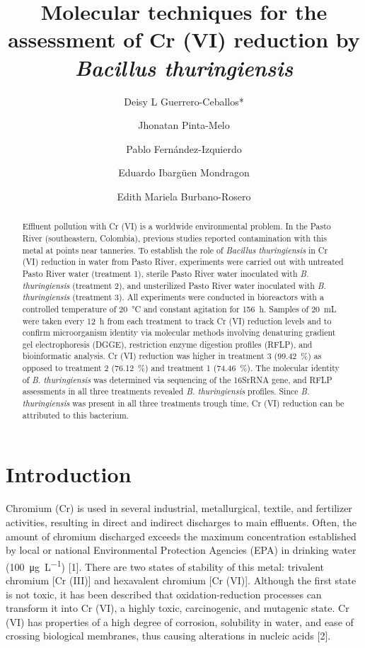 \documentclass{univsciauth}
\title{
        Molecular techniques for the assessment of Cr (VI) reduction by
        \emph{Bacillus thuringiensis}
}
\author[1]{Deisy L Guerrero-Ceballos*}
\author[1]{Jhonatan Pinta-Melo}
\author[1]{Pablo Fernández-Izquierdo}
\author[2]{Eduardo Ibargüen Mondragon}
\author[1,2]{Edith Mariela Burbano-Rosero}
\begin{document}
\maketitle
\thispagestyle{firstpage}

\begin{abstract}
Effluent pollution with Cr (VI) is a worldwide
environmental problem. In the Pasto River (southeastern, Colombia),
previous studies reported contamination with this metal at points near
tanneries. To establish the role of \emph{Bacillus thuringiensis} in Cr
(VI) reduction in water from Pasto River, experiments were carried out
with untreated Pasto River water (treatment 1), sterile Pasto
River water inoculated with \emph{B. thuringiensis} (treatment 2), and
unsterilized Pasto River water inoculated with \emph{B. thuringiensis}
(treatment 3). All experiments were conducted in bioreactors with a
controlled temperature of \SI{20}{\celsius} and constant agitation for \SI{156}{h}.
Samples of \SI{20}{mL} were taken every \SI{12}{h} from each treatment to track
Cr (VI) reduction levels and to confirm microorganism identity via
molecular methods involving denaturing gradient gel electrophoresis
(DGGE), restriction enzyme digestion profiles (RFLP), and bioinformatic
analysis. Cr (VI) reduction was higher in treatment 3 (\SI{99.42}{\%}) as
opposed to treatment 2 (\SI{76.12}{\%}) and treatment 1 (\SI{74.46}{\%}). The
molecular identity of \emph{B. thuringiensis} was determined via
sequencing of the 16SrRNA gene, and RFLP assessments in all three
treatments revealed \emph{B. thuringiensis} profiles. Since \emph{B.
thuringiensis} was present in all three treatments trough time, Cr (VI)
reduction can be attributed to this bacterium.

\end{abstract}

\section{Introduction}

Chromium (Cr) is used in several industrial, metallurgical, textile, and
fertilizer activities, resulting in direct and indirect discharges to
main effluents. Often, the amount of chromium discharged exceeds the
maximum concentration established by local or national Environmental
Protection Agencies (EPA) in drinking water (\SI{100}{\micro\gram\per\liter})
{[}1{]}. There
are two states of stability of this metal: trivalent chromium {[}Cr
(III){]} and hexavalent chromium {[}Cr (VI){]}. Although the first state
is not toxic, it has been described that oxidation-reduction processes
can transform it into Cr (VI), a highly toxic, carcinogenic, and
mutagenic state. Cr (VI) has properties of a high degree of corrosion,
solubility in water, and ease of crossing biological membranes, thus
causing alterations in nucleic acids {[}2{]}.
\end{document}
